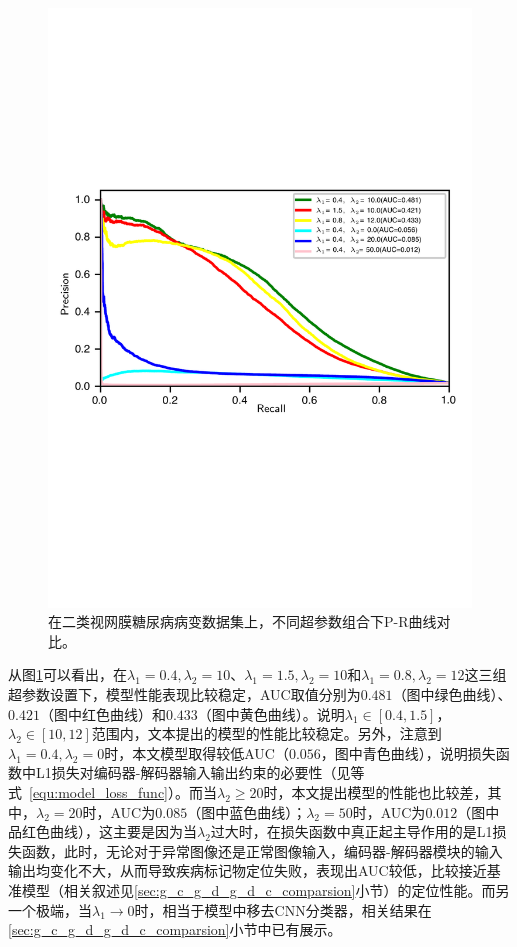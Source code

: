 \begin{figure}[h]
	\centering
	\includegraphics[width=1.0\textwidth]{figure/pr_curve_retinal_hyper_paras/pr_curve.pdf}
	\caption[不同超参数组合下P-R曲线对比]{在二类视网膜糖尿病病变数据集上，不同超参数组合下P-R曲线对比。}
	\label{fig:pr_curve_retinal_hyper_paras}
\end{figure}

从图\ref{fig:pr_curve_retinal_hyper_paras}可以看出，在$\lambda_{1}=0.4, \lambda_{2}=10$、$\lambda_{1}=1.5,\lambda_{2}=10$和$\lambda_{1}=0.8,\lambda_{2}=12$这三组超参数设置下，模型性能表现比较稳定，AUC取值分别为$0.481$（图中绿色曲线）、$0.421$（图中红色曲线）和$0.433$（图中黄色曲线）。说明$\lambda_{1}\in [0.4,1.5]$，$\lambda_{2}\in [10,12]$范围内，文本提出的模型的性能比较稳定。另外，注意到$\lambda_{1}=0.4,\lambda_{2}=0$时，本文模型取得较低AUC（$0.056$，图中青色曲线），说明损失函数中L1损失对编码器-解码器输入输出约束的必要性（见等式~\ref{equ:model_loss_func}）。而当$\lambda_{2}\geq 20$时，本文提出模型的性能也比较差，其中，$\lambda_{2}=20$时，AUC为$0.085$（图中蓝色曲线）；$\lambda_{2}=50$时，AUC为$0.012$（图中品红色曲线），这主要是因为当$\lambda_{2}$过大时，在损失函数中真正起主导作用的是L1损失函数，此时，无论对于异常图像还是正常图像输入，编码器-解码器模块的输入输出均变化不大，从而导致疾病标记物定位失败，表现出AUC较低，比较接近基准模型（相关叙述见\ref{sec:g_c_g_d_g_d_c_comparsion}小节）的定位性能。而另一个极端，当$\lambda_{1}\rightarrow 0$时，相当于模型中移去CNN分类器，相关结果在\ref{sec:g_c_g_d_g_d_c_comparsion}小节中已有展示。

